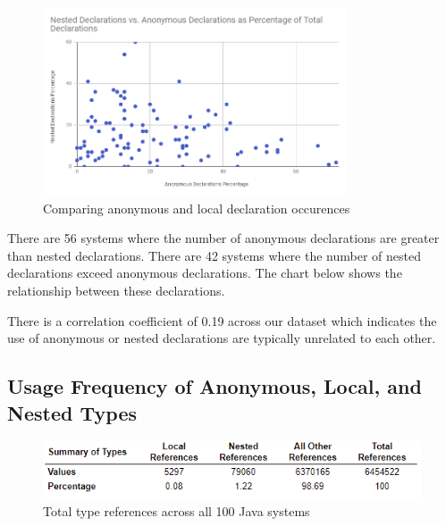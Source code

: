 \documentclass[12p]{article}
\begin{document}
\begin{figure}[H]
  \begin{center}
    \includegraphics[width=0.8\textwidth]{NestedVsAnon.PNG}
    \caption{Comparing anonymous and local declaration occurences}
    \label{fig:NestedVsAnon}
  \end{center}
\end{figure}

There are 56 systems where the number of anonymous declarations are greater than nested declarations. There are 42 systems where the number of nested declarations exceed anonymous declarations. The chart below shows the relationship between these declarations.

There is a correlation coefficient of 0.19 across our dataset which indicates the use of anonymous or nested declarations are typically unrelated to each other.


\subsection{Usage Frequency of Anonymous, Local, and Nested Types}

\begin{figure}[H]
  \begin{center}
    \includegraphics{References.PNG}
    \caption{Total type references across all 100 Java systems}
    \label{fig:References}
  \end{center}
\end{figure}
\end{document}
